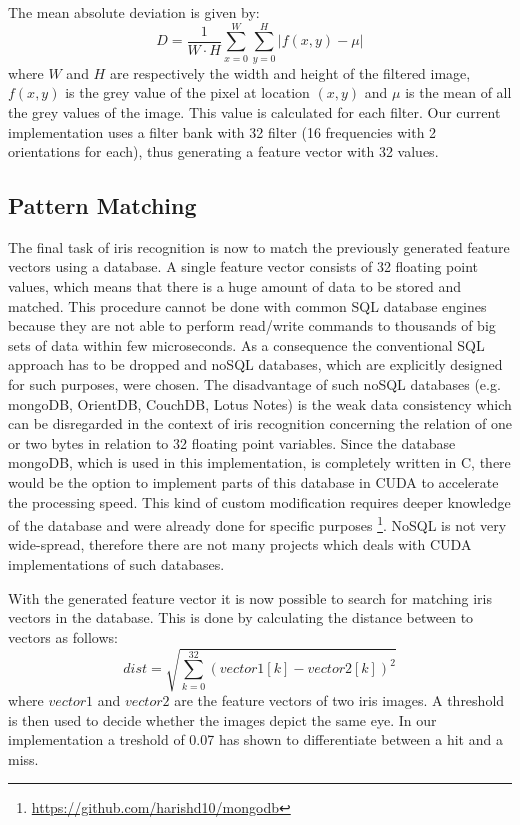 \documentclass[journal]{IEEEtran}
\begin{document}
The mean absolute deviation is given by:
\[
D = \frac{1}{W\cdot H} \sum \limits_{x=0}^W \sum \limits_{y=0}^H |f(x,y) - \mu|
\]
where $W$ and $H$ are respectively the width and height of the filtered image, $f(x,y)$ is the grey value of the pixel at location $(x,y)$ and $\mu$ is the mean of all the grey values of the image. This value is calculated for each filter. Our current implementation uses a filter bank with 32 filter (16 frequencies with 2 orientations for each), thus generating a feature vector with 32 values.

\subsection{Pattern Matching}

The final task of iris recognition is now to match the previously generated feature vectors using a database. A single feature vector consists of 32 floating point values, which means that there is a huge amount of data to be stored and matched. This procedure cannot be done with common SQL database engines because they are not able to perform read/write commands to thousands of big sets of data within few microseconds. As a consequence the conventional SQL approach has to be dropped and noSQL databases, which are explicitly designed for such purposes, were chosen. The disadvantage of such noSQL databases (e.g. mongoDB, OrientDB, CouchDB, Lotus Notes) is the weak data consistency which can be disregarded in the context of iris recognition concerning the relation of one or two bytes in relation to 32 floating point variables. Since the database mongoDB, which is used in this implementation, is completely written in C, there would be the option to implement parts of this database in CUDA to accelerate the processing speed. This kind of custom modification requires deeper knowledge of the database and were already done for specific purposes \footnote{\url{https://github.com/harishd10/mongodb}}. NoSQL is not very wide-spread, therefore there are not many projects which deals with CUDA implementations of such databases.
\par With the generated feature vector it is now possible to search for matching iris vectors in the database. This is done by calculating the distance between to vectors as follows:
\[
dist = \sqrt{\sum_{k=0}^{32}{(vector1[k]-vector2[k])}^2}
\]
where $vector1$ and $vector2$ are the feature vectors of two iris images. A threshold is then used to decide whether the images depict the same eye. In our implementation a treshold of 0.07 has shown to differentiate between a hit and a miss.
\end{document}
